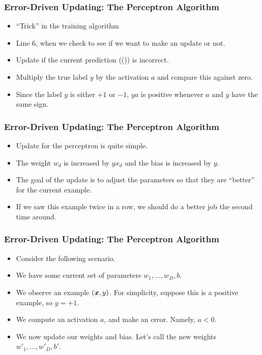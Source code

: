 \documentclass[trans]{beamer}
\begin{document}
\begin{frame}
  \frametitle{Error-Driven Updating: The Perceptron Algorithm}
\begin{itemize}
\item
``Trick'' in the training algorithm
\item Line 6, when we check to see if we
want to make an update or not.
\item  Update if the
current prediction (()) is incorrect. 
\item Multiply the true label $y$ by the activation $a$ and compare
this against zero. 
\item Since the label $y$ is either $+1$ or $-1$,  $ya$ is positive whenever $a$ and $y$ have
the same sign.  
\end{itemize}
\end{frame}

\begin{frame}
  \frametitle{Error-Driven Updating: The Perceptron Algorithm}
\begin{itemize}
\item
Update for the perceptron is quite simple.  
\item The
weight $w_d$ is increased by $y x_d$ and the bias is increased by
$y$.  
\item The goal of the update is to adjust the parameters so that they
are ``better'' for the current example. 
\item If we saw
this example twice in a row, we should do a better job the second time
around.
\end{itemize}
\end{frame}

\begin{frame}
  \frametitle{Error-Driven Updating: The Perceptron Algorithm}
\begin{itemize}
\item
Consider the
following scenario.  
\item We have some current set of parameters $w_1,
\dots, w_D, b$.  
\item We observe an example $({\boldsymbol{x}},y)$.  For simplicity,
suppose this is a positive example, so $y=+1$.
\item  We compute an
activation $a$, and make an error.  Namely, $a<0$.  
\item We now update our
weights and bias.  Let's call the new weights $w'_1, \dots, w'_D,
b'$.  
\end{itemize}
\end{frame}
\end{document}
